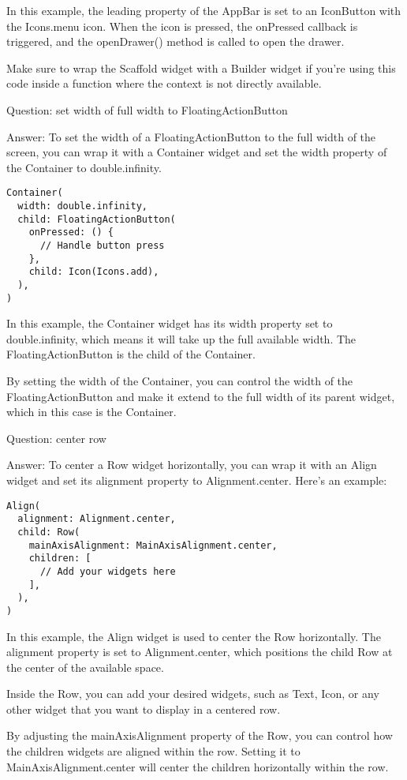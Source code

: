 In this example, the leading property of the AppBar is set to an IconButton with the Icons.menu icon. When the 
icon is pressed, the onPressed callback is triggered, and the openDrawer() method is called to open the drawer.

Make sure to wrap the Scaffold widget with a Builder widget if you're using this code inside a function 
where the context is not directly available.

Question: set width of full width to FloatingActionButton

Answer: To set the width of a FloatingActionButton to the full width of the screen, you can wrap it with a Container 
widget and set the width property of the Container to double.infinity.

\begin{lstlisting}
Container(
  width: double.infinity,
  child: FloatingActionButton(
    onPressed: () {
      // Handle button press
    },
    child: Icon(Icons.add),
  ),
)
\end{lstlisting}

In this example, the Container widget has its width property set to double.infinity, which means it will take up the
full available width. The FloatingActionButton is the child of the Container.

By setting the width of the Container, you can control the width of the FloatingActionButton and make it extend 
to the full width of its parent widget, which in this case is the Container.

Question: center row

Answer: To center a Row widget horizontally, you can wrap it with an Align widget and set its alignment 
property to Alignment.center. Here's an example:

\begin{lstlisting}
Align(
  alignment: Alignment.center,
  child: Row(
    mainAxisAlignment: MainAxisAlignment.center,
    children: [
      // Add your widgets here
    ],
  ),
)
\end{lstlisting}

In this example, the Align widget is used to center the Row horizontally. The alignment property is set to 
Alignment.center, which positions the child Row at the center of the available space.

Inside the Row, you can add your desired widgets, such as Text, Icon, or any other widget that you want to display 
in a centered row.

By adjusting the mainAxisAlignment property of the Row, you can control how the children widgets are aligned within 
the row. Setting it to MainAxisAlignment.center will center the children horizontally within the row.


